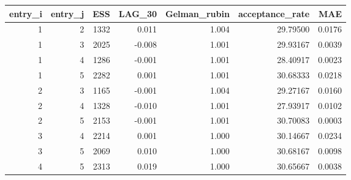 \begin{longtable}{rrrrrrr}
\toprule
entry\_i & entry\_j & ESS & LAG\_30 & Gelman\_rubin & acceptance\_rate & MAE \\ 
\midrule
1 & 2 & 1332 & 0.011 & 1.004 & 29.79500 & 0.0176 \\ 
1 & 3 & 2025 & -0.008 & 1.001 & 29.93167 & 0.0039 \\ 
1 & 4 & 1286 & -0.001 & 1.001 & 28.40917 & 0.0023 \\ 
1 & 5 & 2282 & 0.001 & 1.001 & 30.68333 & 0.0218 \\ 
2 & 3 & 1165 & -0.001 & 1.004 & 29.27167 & 0.0160 \\ 
2 & 4 & 1328 & -0.010 & 1.001 & 27.93917 & 0.0102 \\ 
2 & 5 & 2153 & -0.001 & 1.001 & 30.70083 & 0.0003 \\ 
3 & 4 & 2214 & 0.001 & 1.000 & 30.14667 & 0.0234 \\ 
3 & 5 & 2069 & 0.010 & 1.000 & 30.68167 & 0.0098 \\ 
4 & 5 & 2313 & 0.019 & 1.000 & 30.65667 & 0.0038 \\ 
\bottomrule
\end{longtable}

